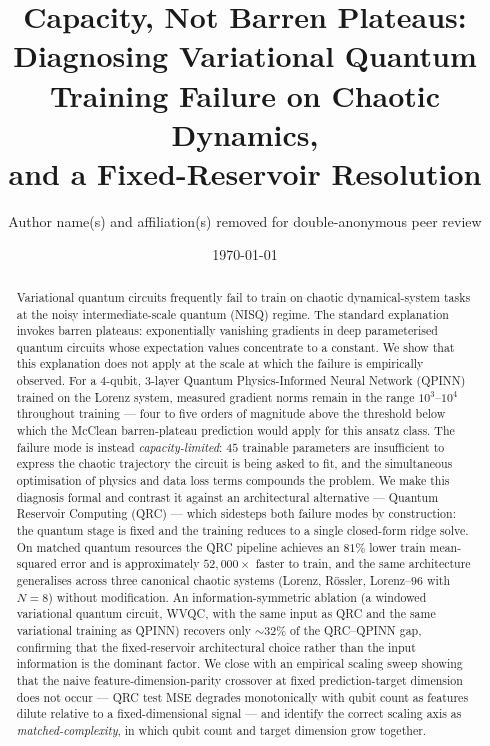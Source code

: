 \documentclass[11pt,a4paper]{article}
\title{Capacity, Not Barren Plateaus:\\
Diagnosing Variational Quantum Training Failure on Chaotic Dynamics,\\
and a Fixed-Reservoir Resolution}
\author{Author name(s) and affiliation(s) removed for double-anonymous peer review}
\date{\today}
\begin{document}
\maketitle

\begin{abstract}
Variational quantum circuits frequently fail to train on chaotic
dynamical-system tasks at the noisy intermediate-scale quantum (NISQ)
regime. The standard explanation invokes barren plateaus: exponentially
vanishing gradients in deep parameterised quantum circuits whose
expectation values concentrate to a constant. We show that this
explanation does not apply at the scale at which the failure is
empirically observed.
For a $4$-qubit, $3$-layer Quantum Physics-Informed Neural Network
(QPINN) trained on the Lorenz system, measured gradient norms remain
in the range $10^3$--$10^4$ throughout training --- four to five orders
of magnitude above the threshold below which the McClean barren-plateau
prediction would apply for this ansatz class.
The failure mode is instead \emph{capacity-limited}: $45$ trainable
parameters are insufficient to express the chaotic trajectory the
circuit is being asked to fit, and the simultaneous optimisation of
physics and data loss terms compounds the problem.
We make this diagnosis formal and contrast it against an architectural
alternative --- Quantum Reservoir Computing (QRC) --- which sidesteps
both failure modes by construction: the quantum stage is fixed and the
training reduces to a single closed-form ridge solve.
On matched quantum resources the QRC pipeline achieves an $81\%$ lower
train mean-squared error and is approximately $52{,}000\times$ faster
to train, and the same architecture generalises across three canonical
chaotic systems (Lorenz, R\"{o}ssler, Lorenz--96 with $N=8$) without
modification.
An information-symmetric ablation (a windowed variational quantum
circuit, WVQC, with the same input as QRC and the same variational
training as QPINN) recovers only $\sim\!32\%$ of the QRC--QPINN gap,
confirming that the fixed-reservoir architectural choice rather than
the input information is the dominant factor.
We close with an empirical scaling sweep showing that the naive
feature-dimension-parity crossover at fixed prediction-target
dimension does not occur --- QRC test MSE degrades monotonically with
qubit count as features dilute relative to a fixed-dimensional signal
--- and identify the correct scaling axis as
\emph{matched-complexity}, in which qubit count and target dimension
grow together.
\end{abstract}
\end{document}
